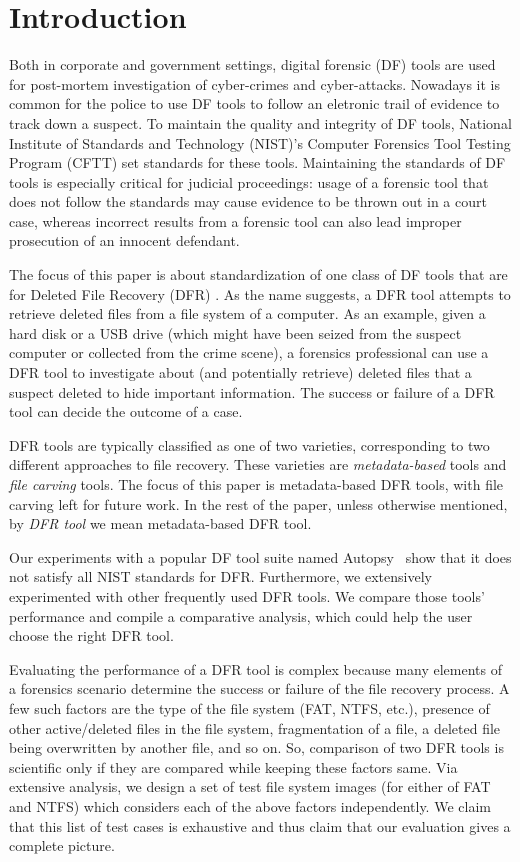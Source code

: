 
\section{Introduction}

Both in corporate and government settings, digital forensic (DF) tools are used for post-mortem investigation of cyber-crimes and cyber-attacks. 
Nowadays it is common \cite{df:news} for the police to use DF tools to follow an eletronic trail of evidence to track down a suspect. 
To maintain the quality and integrity of DF tools, National Institute of Standards and Technology (NIST)'s 
Computer Forensics Tool Testing Program (CFTT) \cite{cftt:nist} 
set standards for these tools. Maintaining the standards of DF tools 
is especially critical for judicial proceedings: usage of a forensic tool that does not follow the standards may cause evidence to be thrown 
out in a court case, whereas incorrect results from a forensic tool can also lead improper prosecution of an innocent defendant. 

The focus of this paper is about standardization of one class of DF 
tools that are for Deleted File Recovery (DFR) \cite{meta:dfr:standards}. 
As the name suggests, a DFR tool attempts to retrieve deleted files
from a file system of a computer. As an example, given a hard disk or a USB drive 
(which might have been seized from the suspect computer or collected from the crime scene), a 
forensics professional can use a DFR tool to investigate about (and potentially retrieve) deleted files that 
a suspect deleted to hide important information. 
The success or failure of a DFR tool can decide the outcome of a case.  

DFR tools are typically classified as one of two varieties, corresponding to two different approaches to file recovery.
These varieties are \emph{metadata-based} tools and \emph{file carving} tools.
The focus of this paper is metadata-based DFR tools, with file carving left for future work.
In the rest of the paper, unless otherwise mentioned, by \emph{DFR tool} we mean metadata-based DFR tool.

Our experiments with a popular DF tool suite named Autopsy~\cite{autopsy} 
show that it does not satisfy all NIST standards for DFR. 
Furthermore, we extensively experimented with other frequently used DFR tools. 
We compare those tools' performance and compile a comparative analysis, which could help the user choose the right DFR tool. 

Evaluating the performance of a DFR tool is complex because many elements of a forensics scenario determine 
the success or failure of the file recovery process. 
A few such factors are the type of the file system (FAT, NTFS, etc.), presence of other active/deleted 
files in the file system, fragmentation of a file, a deleted file being overwritten by another file, and so on.
So, comparison of two DFR tools is scientific only if they are compared while keeping these factors same. 
Via extensive analysis, we design a set of test file system images (for either of FAT and NTFS) which considers each of the above factors independently. 
We claim that this list of test cases is exhaustive and thus claim that our evaluation gives a complete picture. 

